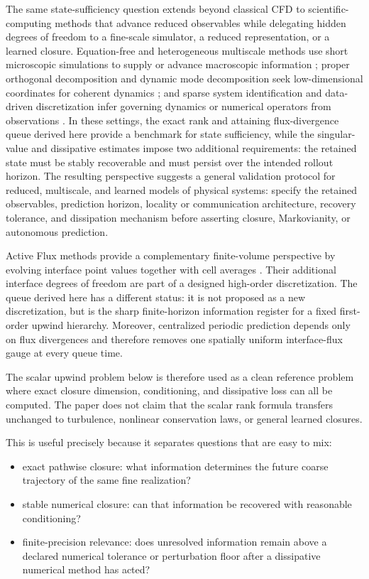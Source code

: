 \documentclass[pdflatex,sn-mathphys-num]{sn-jnl}%
\theoremstyle{thmstyleone}%
\theoremstyle{thmstyletwo}%
\theoremstyle{thmstylethree}%
\begin{document}
The same state-sufficiency question extends beyond classical CFD to scientific-computing
methods that advance reduced observables while delegating hidden degrees of freedom to a
fine-scale simulator, a reduced representation, or a learned closure. Equation-free and
heterogeneous multiscale methods use short microscopic simulations to supply or advance
macroscopic information \cite{kevrekidis2003,eengquist2003}; proper orthogonal
decomposition and dynamic mode decomposition seek low-dimensional coordinates for
coherent dynamics \cite{sirovich1987,schmid2010}; and sparse system identification and data-driven discretization infer governing dynamics or numerical operators from observations
\cite{brunton2016, BarSinai:2019datadriven}. In these settings, the exact rank and attaining
flux-divergence queue derived here provide a benchmark for state sufficiency, while the
singular-value and dissipative estimates impose two additional requirements: the retained
state must be stably recoverable and must persist over the intended rollout horizon. The
resulting perspective suggests a general validation protocol for reduced, multiscale, and
learned models of physical systems: specify the retained observables, prediction horizon,
locality or communication architecture, recovery tolerance, and dissipation mechanism before
asserting closure, Markovianity, or autonomous prediction.

\color{black}
Active Flux methods provide a complementary finite-volume perspective by
evolving interface point values together with cell averages
\cite{Barsukow:2019activeflux,Calhoun:2023activeflux}.  Their additional interface degrees of freedom are part of a designed high-order discretization.  The queue derived here has a different status: it is not proposed as a new discretization, but is the sharp finite-horizon information register for a fixed first-order upwind hierarchy.  Moreover, centralized
periodic prediction depends only on flux divergences and therefore removes
one spatially uniform interface-flux gauge at every queue time.

The scalar upwind problem below is therefore used as a clean reference
problem where exact closure dimension, conditioning, and dissipative loss can
all be computed.  The paper does not claim that the scalar rank formula transfers unchanged to turbulence, nonlinear conservation laws, or general learned closures.

This is useful precisely because it separates questions that are easy to
mix:
\begin{itemize}
\item exact pathwise closure: what information determines the future coarse
trajectory of the same fine realization?
\item stable numerical closure: can that information be recovered with
reasonable conditioning?
\item finite-precision relevance: does unresolved information remain above a declared numerical tolerance or perturbation floor after a dissipative numerical method has acted?
\end{itemize}
\end{document}
